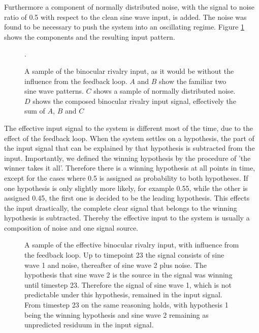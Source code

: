 \documentclass[utf8]{frontiersSCNS} %
\begin{document}
	Furthermore a component of normally distributed noise, with the signal to noise ratio of 0.5 with respect to the clean sine wave input, is added. The noise was found to be necessary to push the system into an oscillating regime.  Figure \ref{input_without_feedback} shows the components and the resulting input pattern.
	
    \begin{figure}
    \centering
    
    \caption[Binocular rivalry input, as it would be without the influence from the feedback loop.]{A sample of the binocular rivalry input, as it would be without the influence from the feedback loop. $A$ and $B$ show the familiar two sine wave patterns. $C$ shows a sample of normally distributed noise. $D$ shows the composed binocular rivalry input signal, effectively the sum of $A$, $B$ and $C$}.
    \label{input_without_feedback}
    \end{figure}	


	The effective input signal to the system is different most of the time, due to the effect of the feedback loop. When the system settles on a hypothesis, the part of the input signal that can be explained by that hypothesis is subtracted from the input. Importantly, we defined the winning hypothesis by the procedure of 'the winner takes it all'. Therefore there is a winning hypothesis at all points in time, except for the cases where 0.5 is assigned as probability to both hypotheses. If one hypothesis is only slightly more likely, for example 0.55, while the other is assigned 0.45, the first one is decided to be the leading hypothesis. This effects the input drastically, the complete clear signal that belongs to the winning hypothesis is subtracted. Thereby the effective input to the system is usually a composition of noise and one signal source. 
	
	 \begin{figure}
	 \centering
	     
	 \caption[Effective binocular rivalry input, with influence from the feedback loop.]{A sample of the effective binocular rivalry input, with influence from the feedback loop. Up to timepoint 23 the signal consists of sine wave 1 and noise, thereafter of sine wave 2 plus noise. The hypothesis that sine wave 2 is the source in the signal was winning until timestep 23. Therefore the signal of sine wave 1, which is not predictable under this hypothesis, remained in the input signal. From timestep 23 on the same reasoning holds, with hypothesis 1 being the winning hypothesis and sine wave 2 remaining as unpredicted residuum in the input signal.}
	 \label{sample_binocular_input}
	 \end{figure}	
	
\end{document}
